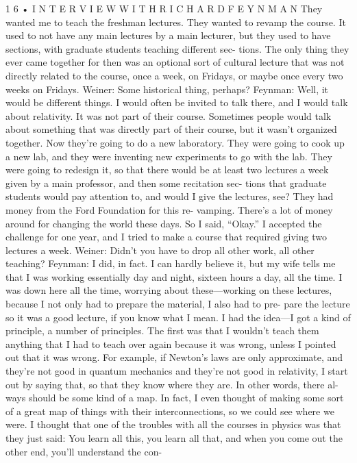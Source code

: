 \documentclass[10pt,oneside]{article}
\begin{document}
1 6 • I N T E R V I E W  W I T H  R I C H A R D  F E Y N M A N They wanted me to teach the freshman lectures. They wanted to revamp the course. It used to not have any main lectures by a main lecturer, but they used to have sections, with graduate students teaching different sec- tions. The only thing they ever came together for then was an optional sort of cultural lecture that was not directly related to the course, once a week, on Fridays, or maybe once every two weeks on Fridays. Weiner: Some historical thing, perhaps? Feynman: Well, it would be different things. I would often be invited to talk there, and I would talk about relativity. It was not part of their course. Sometimes people would talk about something that was directly part of their course, but it wasn’t organized together. Now they’re going to do a new laboratory. They were going to cook up a new lab, and they were inventing new experiments to go with the lab. They were going to redesign it, so that there would be at least two lectures a week given by a main professor, and then some recitation sec- tions that graduate students would pay attention to, and would I give the lectures, see? They had money from the Ford Foundation for this re- vamping. There’s a lot of money around for changing the world these days. So I said, “Okay.” I accepted the challenge for one year, and I tried to make a course that required giving two lectures a week. Weiner: Didn’t you have to drop all other work, all other teaching? Feynman: I did, in fact. I can hardly believe it, but my wife tells me that I was working essentially day and night, sixteen hours a day, all the time. I was down here all the time, worrying about these---working on these lectures, because I not only had to prepare the material, I also had to pre- pare the lecture so it was a good lecture, if you know what I mean. I had the idea---I got a kind of principle, a number of principles. The first was that I wouldn’t teach them anything that I had to teach over again because it was wrong, unless I pointed out that it was wrong. For example, if Newton’s laws are only approximate, and they’re not good in quantum mechanics and they’re not good in relativity, I start out by saying that, so that they know where they are. In other words, there al- ways should be some kind of a map. In fact, I even thought of making some sort of a great map of things with their interconnections, so we could see where we were. I thought that one of the troubles with all the courses in physics was that they just said: You learn all this, you learn all that, and when you come out the other end, you’ll understand the con-\par
\end{document}
